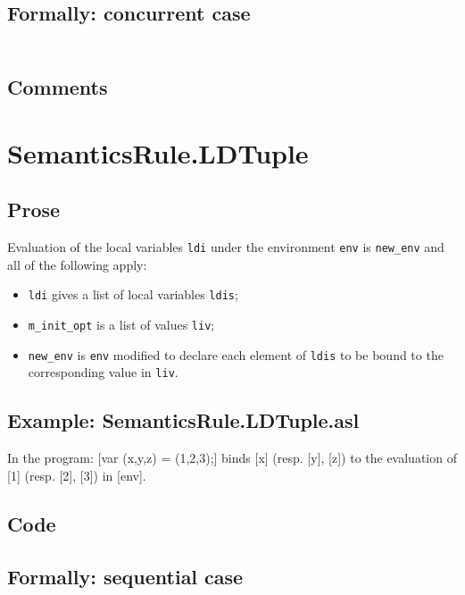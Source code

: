 \documentclass{book}
\begin{document}
  \subsection{Formally: concurrent case}
  \begin{align}
  \end{align} 

    \subsection{Comments}

\section{SemanticsRule.LDTuple \label{sec:SemanticsRule.LDTuple}}

    \subsection{Prose}
Evaluation of the local variables \texttt{ldi} under the environment
\texttt{env} is \texttt{new\_env} and all of the following apply:
    \begin{itemize}
    \item \texttt{ldi} gives a list of local variables \texttt{ldis};
    \item \texttt{m\_init\_opt} is a list of values \texttt{liv};
    \item \texttt{new\_env} is \texttt{env} modified to declare each element of \texttt{ldis} to be bound
      to the corresponding value in \texttt{liv}.
    \end{itemize}

    \subsection{Example: SemanticsRule.LDTuple.asl}
    In the program:
    [var (x,y,z) = (1,2,3);] binds [x] (resp. [y], [z]) to the evaluation of
    [1] (resp. [2], [3]) in [env].

  \subsection{Code}

  \subsection{Formally: sequential case}
  \begin{align}
  \end{align} 
\end{document}
